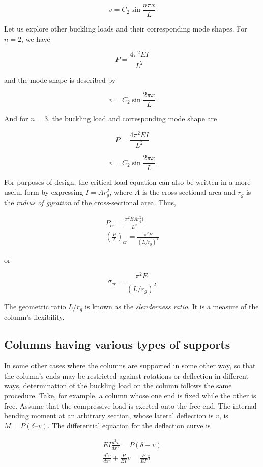 \documentclass[a4paper,openany,12pt]{book}
\begin{document}
{{$$v = C_2\sin \frac{n\pi x}{L}$$

Let us explore other buckling loads and their corresponding mode shapes.
For \(n = 2\), we have

$$P = \frac{4 \pi^2 E I}{L^2}$$

and the mode shape is described by

$$v = C_2 \sin \frac{2 \pi x}{L}$$


And for \(n=3\), the buckling load and corresponding mode shape are

$$P = \frac{4 \pi^2 E I}{L^2}$$

$$v = C_2 \sin \frac{2 \pi x}{L}$$


For purposes of design, the critical load equation can also be written
in a more useful form by expressing \(I = Ar_g^2\), where \(A\) is the
cross-sectional area and \(r_g\) is the \emph{radius of gyration} of the
cross-sectional area. Thus,

$$\begin{gathered}
  P_{cr} = \frac{\pi^2EAr_g^2)}{L^2} \\ 
  \left( \frac{P}{A} \right)_{cr} = \frac{\pi ^2E}{(L/r_g)^2}\end{gathered}$$

or

$$\sigma_{cr} = \frac{\pi ^2E}{(L/r_g)^2}$$

The geometric ratio \(L/r_g\) is known as the \emph{slenderness ratio}. It is a
measure of the column's flexibility.

\subsection{Columns having various types of supports}
\label{sec:org4e74436}
In some other cases where the columns are supported in some other way,
so that the column's ends may be restricted against rotations or
deflection in different ways, determination of the buckling load on the
column follows the same procedure. Take, for example, a column whose one
end is fixed while the other is free. Assume that the compressive load
is exerted onto the free end. The internal bending moment at an
arbitrary section, whose lateral deflection is \(v\), is
\(M = P(\delta – v)\). The differential equation for the deflection curve
is


$$\begin{gathered}
  EI\frac{d^2v}{dx^2} = P(\delta  - v) \\ 
  \frac{d^2v}{dx^2} + \frac{P}{EI}v = \frac{P}{EI}\delta  \\ \end{gathered}$$

}}
\end{document}
